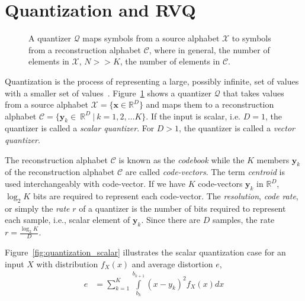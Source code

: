 \documentclass{article}
\begin{document}
\section{Quantization and RVQ}


\begin{figure}[h]	
\centering		
{}
\caption{A quantizer $\mathcal{Q}$ maps symbols from a source alphabet $\mathcal{X}$ to symbols from a reconstruction alphabet $\mathcal{C}$, where in general, the number of elements in $\mathcal{X}$, $N >> K$, the number of elements in $\mathcal{C}$.}
\label{fig:Quantization_block_diagram}
\end{figure}



Quantization is the process of representing a large, possibly infinite, set of values with a smaller set of values~\cite{2005_BOOK_DataCompression_Sayood}.  Figure~\ref{fig:Quantization_block_diagram} shows a quantizer $\mathcal{Q}$ that takes values from a source alphabet $\mathcal{X}=\{\mathbf{x} \in \mathbb{R}^D\}$ and maps them to a reconstruction alphabet $\mathcal{C}=\{\mathbf{y}_k \in \ \mathbb{R}^D \ | \ k=1,2, \ldots K\}$.  If the input is scalar, i.e. $D=1$, the quantizer is called a \emph{scalar quantizer}.  For $D>1$, the quantizer is called a \emph{vector quantizer}.  

The reconstruction alphabet $\mathcal{C}$ is known as the \emph{codebook} while the $K$ members $\mathbf{y}_k$ of the reconstruction alphabet $\mathcal{C}$ are called \emph{code-vectors}.  The term \emph{centroid} is used interchangeably with code-vector.  If we have $K$ code-vectors $\mathbf{y}_k$ in $\mathbb{R}^D$, $\log_2 K$ bits are required to represent each code-vector.   The \emph{resolution}, \emph{code rate}, or simply the \emph{rate} $r$ of a quantizer is the number of bits required to represent each sample, i.e., scalar element of $\mathbf{y}_k$.  Since there are $D$ samples, the rate $r=\frac{\log_2 K}{D}$.  

Figure~\ref{fig:quantization_scalar} illustrates the scalar quantization case for an input $X$ with distribution $f_X(x)$ and average distortion $e$,
\begin{equation}
\begin{array}{ll}
e &=\sum\limits_{k=1}^K \int\limits_{b_k}^{b_{k+1}}(x-y_k)^2f_X(x)dx
\end{array}
\end{equation}
\end{document}
